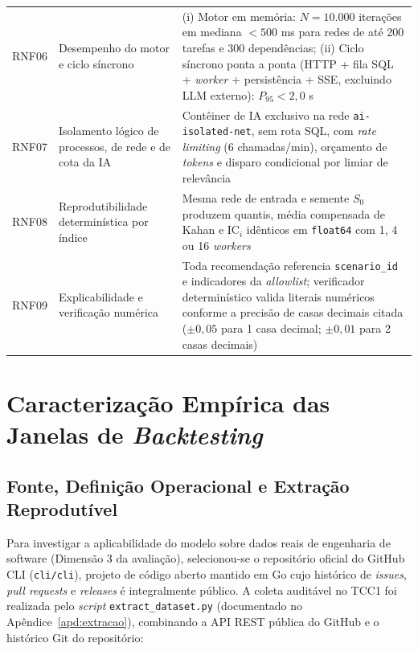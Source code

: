 \documentclass[12pt,openany,oneside,a4paper,english,brazilian,sumario=tradicional]{abntex2}
\newcommand{\fonteautores}{\par\vspace{1mm}{\small Fonte: Elaborado pelos autores (2026).}}
\newcommand{\IC}{\mathrm{IC}}
\begin{document}
\begin{table}[htbp]
\begin{tabularx}{\textwidth}{L{1.2cm} L{4.0cm} Y}
RNF06 & Desempenho do motor e ciclo síncrono & (i) Motor em memória: $N=10.000$ iterações em mediana $< 500$ ms para redes de até 200 tarefas e 300 dependências; (ii) Ciclo síncrono ponta a ponta (HTTP + fila SQL + \textit{worker} + persistência + SSE, excluindo LLM externo): $P_{95} < 2{,}0$ s\\
RNF07 & Isolamento lógico de processos, de rede e de cota da IA & Contêiner de IA exclusivo na rede \texttt{ai-isolated-net}, sem rota SQL, com \textit{rate limiting} (6 chamadas/min), orçamento de \textit{tokens} e disparo condicional por limiar de relevância\\
RNF08 & Reprodutibilidade determinística por índice & Mesma rede de entrada e semente $S_0$ produzem quantis, média compensada de Kahan e $\IC_i$ idênticos em \texttt{float64} com 1, 4 ou 16 \textit{workers}\\
RNF09 & Explicabilidade e verificação numérica & Toda recomendação referencia \texttt{scenario\_id} e indicadores da \textit{allowlist}; verificador determinístico valida literais numéricos conforme a precisão de casas decimais citada ($\pm 0{,}05$ para 1 casa decimal; $\pm 0{,}01$ para 2 casas decimais)\\
\bottomrule
\end{tabularx}
\fonteautores
\end{table}

\section{Caracterização Empírica das Janelas de \textit{Backtesting}}\label{sec:backtesting}

\subsection{Fonte, Definição Operacional e Extração Reprodutível}

Para investigar a aplicabilidade do modelo sobre dados reais de engenharia de software (Dimensão 3 da avaliação), selecionou-se o repositório oficial do GitHub CLI (\texttt{cli/cli}), projeto de código aberto mantido em Go cujo histórico de \textit{issues}, \textit{pull requests} e \textit{releases} é integralmente público. A coleta auditável no TCC1 foi realizada pelo \textit{script} \texttt{extract\_dataset.py} (documentado no Apêndice~\ref{apd:extracao}), combinando a API REST pública do GitHub e o histórico Git do repositório:
\end{document}
